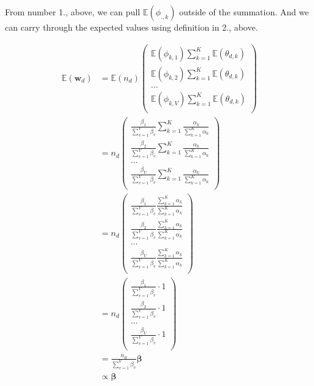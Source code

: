 \documentclass[conference,final,]{IEEEtran}
\begin{document}
From number 1., above, we can pull \(\mathbb{E}(\phi_{.,k})\) outside of
the summation. And we can carry through the expected values using
definition in 2., above.

\begin{align*}
  \mathbb{E}(\mathbf{w}_d) 
    &= \mathbb{E}(n_d)
      \begin{pmatrix}
        \mathbb{E}(\phi_{k,1}) \sum_{k = 1}^K \mathbb{E}(\theta_{d,k}) \\
        \mathbb{E}(\phi_{k,2})\sum_{k = 1}^K \mathbb{E}(\theta_{d,k})\\
        ...\\
        \mathbb{E}(\phi_{k,V})\sum_{k = 1}^K \mathbb{E}(\theta_{d,k}) \\
      \end{pmatrix}\\
    &= n_d
      \begin{pmatrix}
        \frac{\beta_1}{\sum_{v=1}^V\beta_v} 
          \sum_{k = 1}^K \frac{\alpha_k}{\sum_{k = 1}^K \alpha_k} \\
        \frac{\beta_2}{\sum_{v=1}^V\beta_v} 
          \sum_{k = 1}^K \frac{\alpha_k}{\sum_{k = 1}^K \alpha_k} \\
        ...\\
        \frac{\beta_V}{\sum_{v=1}^V\beta_v} 
          \sum_{k = 1}^K \frac{\alpha_k}{\sum_{k = 1}^K \alpha_k} \\
      \end{pmatrix}\\
    &= n_d
      \begin{pmatrix}
        \frac{\beta_1}{\sum_{v=1}^V\beta_v} 
          \frac{\sum_{k = 1}^K \alpha_k}{\sum_{k = 1}^K \alpha_k} \\
        \frac{\beta_2}{\sum_{v=1}^V\beta_v} 
          \frac{\sum_{k = 1}^K \alpha_k}{\sum_{k = 1}^K \alpha_k} \\
        ...\\
        \frac{\beta_V}{\sum_{v=1}^V\beta_v} 
          \frac{\sum_{k = 1}^K \alpha_k}{\sum_{k = 1}^K \alpha_k} \\
      \end{pmatrix}\\
    &= n_d
      \begin{pmatrix}
        \frac{\beta_1}{\sum_{v=1}^V\beta_v} \cdot 1 \\
        \frac{\beta_2}{\sum_{v=1}^V\beta_v} \cdot 1  \\
        ...\\
        \frac{\beta_V}{\sum_{v=1}^V\beta_v} \cdot 1  \\
      \end{pmatrix}\\
   &= \frac{n_d}{\sum_{v=1}^V\beta_v}\boldsymbol\beta \\
   &\propto \boldsymbol\beta
\end{align*}
\end{document}

